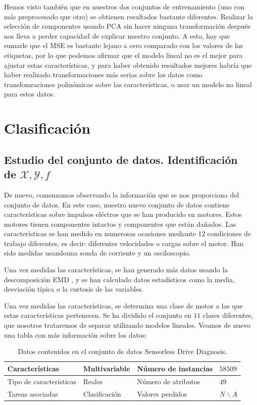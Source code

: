 \documentclass[a4paper, 20pt]{article}
\begin{document}
Hemos visto también que en nuestros dos conjuntos de entrenamiento (uno con más preprocesado que otro) se obtienen resultados bastante diferentes. Realizar la selección de componentes usando PCA sin hacer ninguna transformación después nos lleva a perder capacidad de explicar nuestro conjunto. A esto, hay que sumarle que el MSE es bastante lejano a cero comparado con los valores de las etiquetas, por lo que podemos afirmar que el modelo lineal no es el mejor para ajustar estas características, y para haber obtenido resultados mejores habría que haber realizado transformaciones más serias sobre los datos como transfomraciones polinómicas sobre las características, o usar un modelo no lineal para estos datos. 

\newpage

\section{Clasificación}

\subsection{Estudio del conjunto de datos. Identificación de $\mathcal X, \mathcal Y, f$}

De nuevo, comenzamos observando la información que se nos proporciona del conjunto de datos. En este caso, nuestro nuevo conjunto de datos \cite{noauthor_uci_nodate} contiene características sobre impulsos eléctros que se han producido en motores. Estos motores tienen componentes intactos y componentes que están dañados. Las características se han medido en numerosas ocasiones mediante $12$ condiciones de trabajo diferentes, es decir: diferentes velocidades o cargas sobre el motor. Han sido medidas usandouna sonda de corriente y un osciloscopio.

Una vez medidas las características, se han generado más datos usando la descomposición EMD \cite{noauthor_hilberthuang_2021}, y se han calculado datos estadísticos como la media, desviación típica o la curtosis de las variables.

Una vez medidas las características, se determina una clase de motor a las que estas características pertenecen. Se ha dividido el conjunto en $11$ clases diferentes, que nosotros trataremos de separar utilizando modelos lineales. Veamos de nuevo una tabla con más información sobre los datos:


\begin{table}[h]
  \centering
  \begin{tabular}{|l|l|l|l|}
    \hline
    Características         & Multivariable & Número de instancias & $58509$ \\ \hline
    Tipo de características & Reales        & Número de atributos  & $49$    \\ \hline
    Tareas asociadas        & Clasificación     & Valores perdidos     & $N\backslash A$   \\ \hline
  \end{tabular}
  \caption{Datos contenidos en el conjunto de datos Sensorless Drive Diagnosis.}
\end{table}
\end{document}
